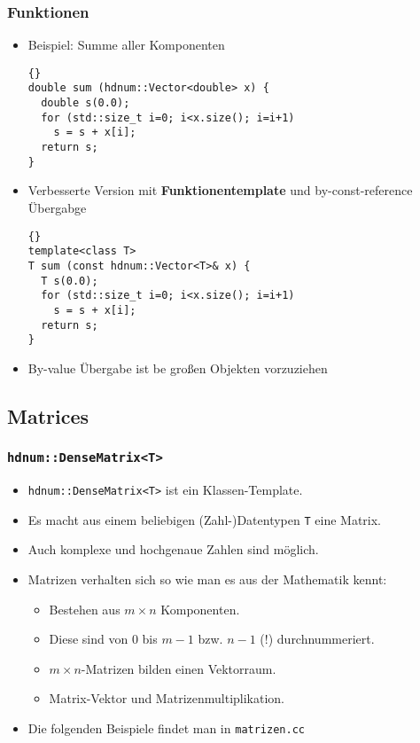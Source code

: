 \documentclass[a4paper,11pt]{article}
\theoremstyle{definition}
\begin{document}
\begin{frame}[fragile]
\frametitle{Funktionen}
\begin{itemize}
\item Beispiel: Summe aller Komponenten\\
{\footnotesize{\begin{lstlisting}{}
double sum (hdnum::Vector<double> x) {
  double s(0.0);
  for (std::size_t i=0; i<x.size(); i=i+1)
    s = s + x[i];
  return s;
}
\end{lstlisting}}}
\item Verbesserte Version mit \textbf{Funktionentemplate} und by-const-reference Übergabge\\
{\footnotesize{\begin{lstlisting}{}
template<class T>
T sum (const hdnum::Vector<T>& x) {
  T s(0.0);
  for (std::size_t i=0; i<x.size(); i=i+1)
    s = s + x[i];
  return s;
}
\end{lstlisting}}}
\item By-value Übergabe ist be großen Objekten vorzuziehen
\end{itemize}
\end{frame}

\subsection{Matrices}

\begin{frame}[fragile]
\frametitle{\lstinline{hdnum::DenseMatrix<T>}}
\begin{itemize}
\item \lstinline{hdnum::DenseMatrix<T>} ist ein Klassen-Template.
\item Es macht aus einem beliebigen (Zahl-)Datentypen \lstinline{T}
  eine Matrix.
\item Auch komplexe und hochgenaue Zahlen sind möglich.
\item Matrizen verhalten sich so wie man es aus der Mathematik kennt:
\begin{itemize}
\item Bestehen aus $m\times n$ Komponenten.
\item Diese sind von $0$ bis $m-1$ bzw. $n-1$ (!) durchnummeriert.
\item $m\times n$-Matrizen bilden einen Vektorraum.
\item Matrix-Vektor und Matrizenmultiplikation.
\end{itemize}
\item Die folgenden Beispiele findet man in \lstinline{matrizen.cc}
\end{itemize}
\end{frame}
\end{document}
